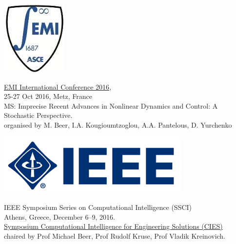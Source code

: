 \documentclass[11pt]{article}%
\begin{document}
\begin{minipage}[t]{0.15\textwidth}
\vspace{1pt}
\includegraphics[width=0.6\linewidth]{symposia/emi.jpeg}
\end{minipage}
\begin{minipage}[t]{0.79\textwidth}
\href{http://www.lem3.fr/2016EMI-IC/index.php?page=start}{EMI International Conference 2016},\\ 
25-27 Oct 2016, Metz, France\\
MS: Imprecise Recent Advances in Nonlinear Dynamics and Control: A Stochastic Perspective.\\
organised by M. Beer, I.A. Kougioumtzoglou, A.A. Pantelous, D. Yurchenko
\end{minipage}

\vspace{10pt}

\begin{minipage}[t]{0.15\textwidth}
\vspace{1pt}
\includegraphics[width=1\linewidth]{symposia/ieeeLogo.png}
\end{minipage}
\hspace{2pt}
\begin{minipage}[t]{0.79\textwidth}
IEEE Symposium Series on Computational Intelligence (SSCI)\\ 
Athens, Greece, December 6–9, 2016. \\
\href{http://ieeexplore.ieee.org/stamp/stamp.jsp?arnumber=7379091}{Symposium Computational Intelligence for Engineering Solutions (CIES)}\\ 
chaired by Prof Michael Beer, Prof Rudolf Kruse, Prof Vladik Kreinovich.
\end{minipage}
\end{document}

